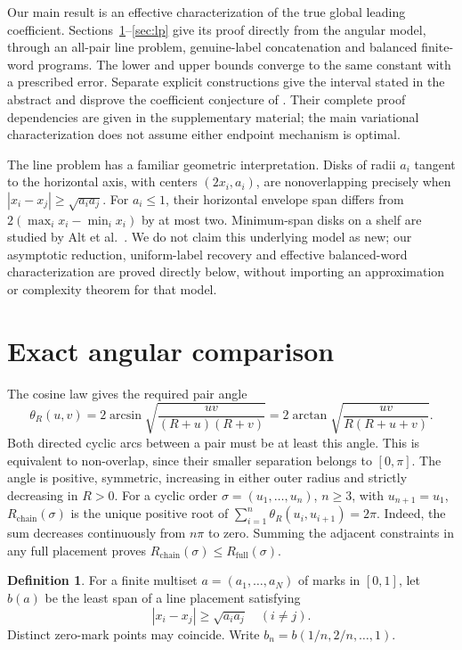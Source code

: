 \documentclass[11pt]{article}
\theoremstyle{definition}\newtheorem{definition}[theorem]{Definition}
\theoremstyle{remark}\newtheorem{remark}[theorem]{Remark}
\newcommand{\ch}{R_{\mathrm{chain}}}
\newcommand{\full}{R_{\mathrm{full}}}
\DeclareMathOperator{\atan}{arctan}
\DeclareMathOperator{\asin}{arcsin}
\begin{document}
Our main result is an effective characterization of the true global leading
coefficient. Sections~\ref{sec:line}--\ref{sec:lp} give its proof directly
from the angular model, through an all-pair line problem, genuine-label
concatenation and balanced finite-word programs. The lower and upper bounds
converge to the same constant with a prescribed error. Separate explicit
constructions give the interval stated in the abstract and disprove the
coefficient conjecture of \cite{v1}. Their complete proof dependencies are
given in the supplementary material; the main variational characterization does
not assume either endpoint mechanism is optimal.

The line problem has a familiar geometric interpretation. Disks of radii
$a_i$ tangent to the horizontal axis, with centers $(2x_i,a_i)$, are
nonoverlapping precisely when $|x_i-x_j|\ge\sqrt{a_i a_j}$.
For $a_i\le1$, their horizontal envelope span differs from
$2(\max_i x_i-\min_i x_i)$ by at most two. Minimum-span disks on a shelf
are studied by Alt et al.\ \cite{shelf}. We do not claim this underlying
model as new; our asymptotic reduction, uniform-label recovery and effective
balanced-word characterization are proved directly below, without importing
an approximation or complexity theorem for that model.

\section{Exact angular comparison}\label{sec:line}

The cosine law gives the required pair angle
\begin{equation}\label{eq:theta}
 \theta_R(u,v)=2\asin\sqrt{\frac{uv}{(R+u)(R+v)}}
 =2\atan\sqrt{\frac{uv}{R(R+u+v)}}.
\end{equation}
Both directed cyclic arcs between a pair must be at least this angle.
This is equivalent to non-overlap, since their smaller separation belongs
to $[0,\pi]$. The angle is positive, symmetric, increasing in either
outer radius and strictly decreasing in $R>0$.
For a cyclic order $\sigma=(u_1,\ldots,u_n)$, $n\ge3$, with $u_{n+1}=u_1$,
$\ch(\sigma)$ is the unique positive root of
$\sum_{i=1}^n\theta_R(u_i,u_{i+1})=2\pi$.
Indeed, the sum decreases continuously from $n\pi$ to zero. Summing the
adjacent constraints in any full placement proves $\ch(\sigma)\le\full(\sigma)$.

\begin{definition}
For a finite multiset $a=(a_1,\ldots,a_N)$ of marks in $[0,1]$, let $b(a)$
be the least span of a line placement satisfying
\begin{equation}\label{eq:line}
 |x_i-x_j|\ge\sqrt{a_i a_j}\quad(i\ne j).
\end{equation}
Distinct zero-mark points may coincide. Write $b_n=b(1/n,2/n,\ldots,1)$.
\end{definition}
\end{document}
